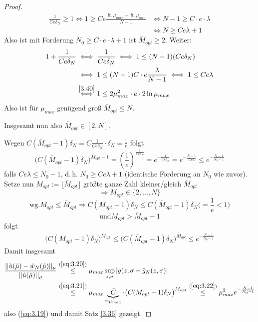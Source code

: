 \begin{proof}
\begin{align*}
	\frac{1}{C e \delta_N} \geq 1 \iff  1 \geq C e \frac{\ln \mu_{max} - \ln \mu_{min}}{N-1} &\iff N -1 \geq C \cdot e \cdot \lambda \\
	&\iff N \geq C e \lambda + 1
\end{align*}
Also ist mit Forderung $N_0 \geq C \cdot e \cdot \lambda + 1$ ist $\bar{M}_{opt} \geq 2$.
Weiter:
\begin{align*}
	1 + \frac{1}{C e \delta_N} &\iff \frac{1}{C e \delta_N} \iff 1 \leq (N-1)(C e \delta_N) \\
	&\iff 1 \leq (N-1) C \cdot e \frac{\lambda}{N-1} \iff 1 \leq C e \lambda \\
	&\overset{\ref{3.40}}{\iff} 1 \leq 2 \mu_{max}^2 \cdot e \cdot 2 \ln \mu_{max}
\end{align*}
Also ist für $\mu_{max}$ genügend groß $\bar{M}_{opt} \leq N$.

Insgesamt nun also $\bar{M}_{opt} \in [2,N]$.

Wegen $C(\bar{M}_{opt} - 1) \delta_N = C \frac{1}{C e \delta_N} \cdot \delta_N = \frac{1}{e}$ folgt
\[
	\Big(C (\bar{M}_{opt} - 1) \delta_N \Big)^{\bar{M}_{opt} -1} = \left( \frac{1}{e} \right)^{\frac{1}{C e \delta_N}} = e^{- \frac{1}{C e \delta_N}} = e^{- \frac{N-1}{C e \lambda}} \leq e^{- \frac{N-1}{N_0 -1}}
\]
falls $C e \lambda \leq N_0 -1$, d.\,h. $N_0 \geq C e \lambda + 1$ (identische Forderung an $N_0$ wie zuvor). Setze nun $M_{opt} := \lfloor \bar{M}_{opt} \rfloor$ größte ganze Zahl kleiner/gleich $\bar{M}_{opt}$
\[
	\Rightarrow M_{opt} \in \{2,\dots,N\}
\]
\[
	\text{wg.} M_{opt} \leq \bar{M}_{opt} \Rightarrow C (M_{opt} - 1) \delta_N \leq C (\bar{M}_{opt} - 1 ) \delta_N \big( = \frac{1}{e} < 1 \big)
\]
\[
	\text{und} M_{opt} > \bar{M}_{opt} - 1
\]
folgt
\begin{align}
	\big( C ( M_{opt} - 1) \delta_N \big)^{M_{opt}} \leq \big( C ( \bar{M}_{opt} - 1) \delta_N \big)^{\bar{M}_{opt}} \leq e^{- \frac{N - 1 }{N_0 - 1}}
	\label{eq:3.22}
\end{align}
Damit insgesamt
\begin{align*}
	\frac{||\hat{u}(\hat{\mu}) - \hat{w}_N (\hat{\mu}) ||_{\mu}}{|| \hat{u}(\hat{\mu}) ||_{\mu}} &\overset{(\ref{eq:3.20})}{\leq} \mu_{max} \sup_{z,\sigma} |g(z,\sigma - \tilde{g}_N(z,\sigma)| \\
	&\overset{(\ref{eq:3.21})}{\leq} \mu_{max} \underbrace{\bar{C}}_{= \mu_{max}} \cdot \big( C (M_{opt} - 1) \delta_N \big)^{M_{opt}} \overset{(\ref{eq:3.22})}{\leq} \mu_{max}^2 e^{- \frac{N - 1}{N_0 - 1}}
\end{align*}
also (\ref{eq:3.19}) und damit Satz \ref{3.36} gezeigt.
\end{proof}

